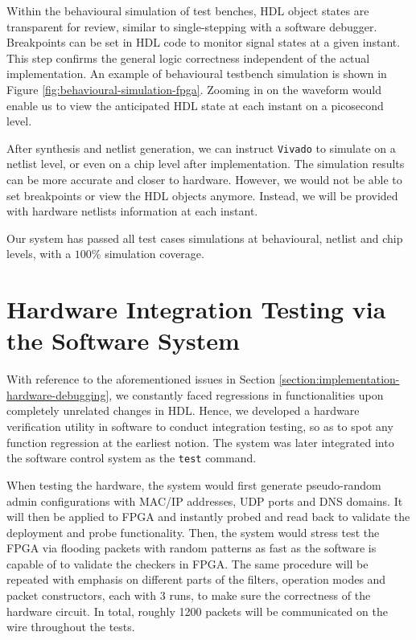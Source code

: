 \documentclass[a4paper]{report}
\newcommand{\code}{\texttt}
\begin{document}
Within the behavioural simulation of test benches, HDL object states are transparent for review, similar to single-stepping with a software debugger. Breakpoints can be set in HDL code to monitor signal states at a given instant. This step confirms the general logic correctness independent of the actual implementation. An example of behavioural testbench simulation is shown in Figure \ref{fig:behavioural-simulation-fpga}. Zooming in on the waveform would enable us to view the anticipated HDL state at each instant on a picosecond level.

After synthesis and netlist generation, we can instruct \code{Vivado} to simulate on a netlist level, or even on a chip level after implementation. The simulation results can be more accurate and closer to hardware. However, we would not be able to set breakpoints or view the HDL objects anymore. Instead, we will be provided with hardware netlists information at each instant.

Our system has passed all test cases simulations at behavioural, netlist and chip levels, with a $100\%$ simulation coverage.

\section{Hardware Integration Testing via the Software System}

With reference to the aforementioned issues in Section \ref{section:implementation-hardware-debugging}, we constantly faced regressions in functionalities upon completely unrelated changes in HDL. Hence, we developed a hardware verification utility in software to conduct integration testing, so as to spot any function regression at the earliest notion. The system was later integrated into the software control system as the \code{test} command. 

When testing the hardware, the system would first generate pseudo-random admin configurations with MAC/IP addresses, UDP ports and DNS domains. It will then be applied to FPGA and instantly probed and read back to validate the deployment and probe functionality. Then, the system would stress test the FPGA via flooding packets with random patterns as fast as the software is capable of to validate the checkers in FPGA. The same procedure will be repeated with emphasis on different parts of the filters, operation modes and packet constructors, each with 3 runs, to make sure the correctness of the hardware circuit. In total, roughly 1200 packets will be communicated on the wire throughout the tests. 
\end{document}
